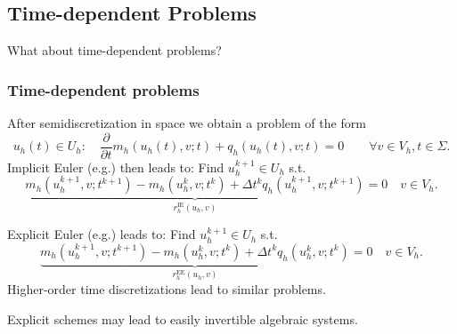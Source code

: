 \subsection{Time-dependent Problems}

What about time-dependent problems?

\begin{frame}
\frametitle<presentation>{Time-dependent problems}
After semidiscretization in space we obtain a problem of the form
\begin{equation*}
u_h(t)\in U_h : \quad \frac{\partial}{\partial t} m_h(u_h(t),v;t) + q_h(u_h(t),v;t)
= 0 \qquad \forall v\in V_h, t\in\Sigma. 
\end{equation*}
Implicit Euler (e.g.) then leads to: Find $u_h^{k+1}\in U_h$ s.t.
\begin{equation*}
\underbrace{m_h(u_h^{k+1},v;t^{k+1}) - m_h(u_h^{k},v;t^k) + \Delta
t^{k}q_h(u_h^{k+1},v;t^{k+1})}_{r_h^\text{IE}(u_h,v)}  = 0
\quad v\in V_h.
\end{equation*}

Explicit Euler (e.g.) leads to: Find  $u_h^{k+1}\in U_h$ s.t.
\begin{equation*}
\underbrace{m_h(u_h^{k+1},v;t^{k+1}) - m_h(u_h^{k},v;t^k) + \Delta
t^{k}q_h(u_h^{k},v;t^{k})}_{r_h^\text{EE}(u_h,v)}  = 0
\quad v\in V_h.
\end{equation*}
Higher-order time discretizations lead to similar problems.

Explicit schemes may lead to easily invertible algebraic systems.
\end{frame}

\cleardoublepage
